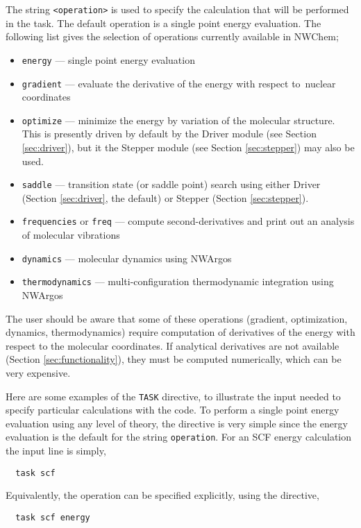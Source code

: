The string \verb+<operation>+ is used to specify the calculation that will
be performed in the task.  The default operation is a single point energy
evaluation.  The following list gives the selection of operations currently
available in NWChem;
\begin{itemize}
\item \verb+energy+ --- single point energy evaluation
\item \verb+gradient+ --- evaluate the derivative of the energy with respect to\
   nuclear coordinates
\item \verb+optimize+ --- minimize the energy by variation of the molecular
   structure.  This is presently driven by default by the Driver
   module (see Section \ref{sec:driver}), but it the Stepper module
   (see Section \ref{sec:stepper}) may also be used.
\item \verb+saddle+ --- transition state (or saddle point) search
  using either Driver (Section \ref{sec:driver}, the default) or
  Stepper (Section \ref{sec:stepper}).
\item \verb+frequencies+ or \verb+freq+ --- compute second-derivatives 
and print out an analysis of molecular vibrations
\item \verb+dynamics+ --- molecular dynamics using NWArgos
\item \verb+thermodynamics+ --- multi-configuration thermodynamic integration
    using NWArgos
\end{itemize}


The user should be aware that some of these operations (gradient,
optimization, dynamics, thermodynamics) require computation of
derivatives of the energy with respect to the molecular coordinates.
If analytical derivatives are not available (Section
\ref{sec:functionality}), they must be computed numerically, which can
be very expensive.

Here are some examples of the \verb+TASK+ directive, to illustrate the
input needed to specify particular calculations with the code.  To
perform a single point energy evaluation using any level of theory, the
directive is very simple since the energy evaluation is the default
for the string \verb+operation+.  For an SCF energy calculation the
input line is simply,
\begin{verbatim}
  task scf
\end{verbatim}
Equivalently, the operation can be specified explicitly, using the
directive,
\begin{verbatim}
  task scf energy
\end{verbatim}

